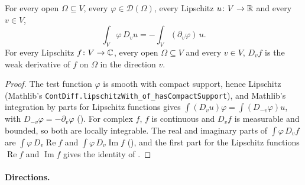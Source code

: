 \begin{lemma}
\label{lem:lipschitz-weak-derivative}
\leanok
{}
For every open $\Omega \subseteq V$, every $\varphi \in \mathcal D(\Omega)$, every Lipschitz
$u \colon V \to \mathbb{R}$ and every $v \in V$,
\[
  \int_V \varphi \, D_v u = -\int_V (\partial_v \varphi) \, u .
\]
For every Lipschitz $f \colon V \to \mathbb{C}$, every open $\Omega \subseteq V$ and every $v \in V$,
$D_v f$ is the weak derivative of $f$ on $\Omega$ in the direction $v$.
\end{lemma}

\begin{proof}
\leanok
The test function $\varphi$ is smooth with compact support, hence Lipschitz (Mathlib's
\texttt{ContDiff.\allowbreak lipschitzWith\_\allowbreak of\_\allowbreak hasCompactSupport}), and
Mathlib's integration by parts for Lipschitz functions gives
$\int (D_v u) \varphi = \int (D_{-v} \varphi) u$, with
$D_{-v} \varphi = -\partial_v \varphi$ (). For
complex $f$, $f$ is continuous and $D_v f$ is measurable and bounded, so both are locally
integrable. The real and imaginary parts of $\int \varphi \, D_v f$ are
$\int \varphi \, D_v \operatorname{Re} f$ and
$\int \varphi \, D_v \operatorname{Im} f$ (), and
the first part for the Lipschitz functions $\operatorname{Re} f$ and $\operatorname{Im} f$ gives
the identity of .
\end{proof}

\paragraph{Directions.}

